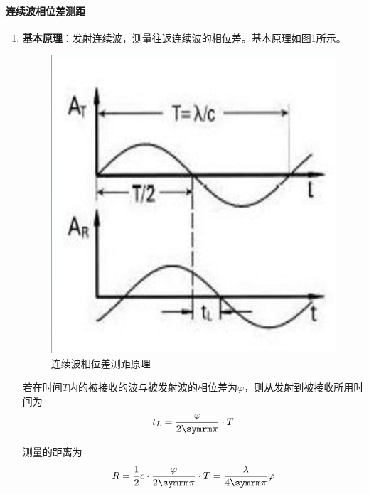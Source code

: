 \paragraph{连续波相位差测距}
\begin{enumerate}
	\item \textbf{基本原理}：发射连续波，测量往返连续波的相位差。基本原理如图\ref{fig:连续波相位差测距原理}所示。
		
		\begin{figure}[htbp]
			\centering
			\includegraphics[width=0.5\linewidth,height=0.2\textheight]{figure/Chapter3/连续波相位差测距原理}
			\caption{连续波相位差测距原理}
			\label{fig:连续波相位差测距原理}
		\end{figure}
		
		若在时间$ T $内的被接收的波与被发射波的相位差为$ \varphi $，则从发射到被接收所用时间为
		\begin{equation}
		t_L = \dfrac{\varphi}{2\cpi}\cdot T
		\end{equation}
		
		测量的距离为
		\begin{equation}
		R = \dfrac{1}{2}c \cdot \dfrac{\varphi}{2\cpi}\cdot T = \dfrac{\lambda}{4\cpi}\varphi
		\end{equation}
	

\end{enumerate}
